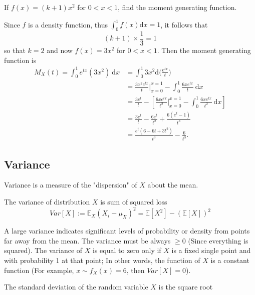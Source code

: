 \begin{example}
    If $f(x) = (k + 1)x^2$ for $0 < x < 1$, find the moment generating function.
\end{example}
\begin{solution}
    Since $f$ is a density function, thus $\int_{0}^{1} f(x) \mathrm{d}x = 1$, it follows that 
    \[
        (k+1)\times \frac{1}{3} = 1
    \]
    so that $k = 2$ and now $f(x) = 3x^2$ for $0 < x < 1$. Then the moment generating function is 
    \begin{align*}
        M_X(t) = \int_{0}^{1} e^{tx}(3x^2) \> \mathrm{d}x
        &= \int_{0}^{1} 3x^2 \mathrm{d}\bigg( \frac{e^{tx}}{t}\bigg)\\
        &= \frac{3x^2e^{tx}}{t} \bigg \vert^{x= 1}_{x=0} - \int_{0}^{1} \frac{6xe^{tx}}{t} \> \mathrm{d}x\\
        &= \frac{3e^{t}}{t} - \left[ \frac{6xe^{tx}}{t^2} \bigg \vert^{x=1}_{x=0} - \int_{0}^{1} \frac{6xe^{tx}}{t^2} \> \mathrm{d}x \right]\\
        &= \frac{3e^{t}}{t} - \frac{6e^{t}}{t^2} + \frac{6(e^t - 1)}{t^3}\\
        &= \frac{e^t(6 - 6t + 3t^2)}{t^3} - \frac{6}{t^3}.
    \end{align*}
\end{solution}


\subsection{Variance}

Variance is a measure of the "dispersion" of $X$ about the mean. 

\begin{definition}[Variance]
    The variance of distribution $X$ is sum of squared loss
    \begin{equation}
        Var[X] := \mathbb{E}_X (X_i - \mu_X)^2 = \mathbb{E}[X^2] - (\mathbb{E}[X])^2
    \end{equation}
\end{definition}

A large variance indicates significant levels of probability or density from points far away 
from the mean. The variance must be always $\geq 0$ (Since everything is squared). The 
variance of $X$ is equal to zero only if $X$ is a fixed single point and with probability 1 
at that point; In other words, the function of $X$ is a constant function (For example, $x \sim f_X(x) = 6$, then $Var[X] = 0$).

The standard deviation of the random variable $X$ is the square root 


